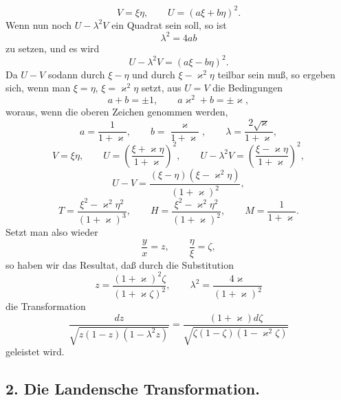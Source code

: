 \documentclass[11pt]{article}
\begin{document}
\[
V=\xi\eta,\qquad U=(a\xi+b\eta)^2.
\]
Wenn nun noch $U-\lambda^2V$ ein Quadrat sein soll, so ist
\[
\lambda^2=4ab
\]
zu setzen, und es wird
\[
U-\lambda^2V=(a\xi-b\eta)^2.
\]
Da $U-V$ sodann durch $\xi-\eta$ und durch $\xi-\varkappa^2\eta$ teilbar sein muß, so ergeben sich, wenn man $\xi=\eta$, $\xi=\varkappa^2\eta$ setzt, aus $U=V$ die Bedingungen
\[
a+b=\pm1,\qquad a\varkappa^2+b=\pm\varkappa,
\]
woraus, wenn die oberen Zeichen genommen werden,
\[
a=\frac1{1+\varkappa},\qquad
b=\frac{\varkappa}{1+\varkappa},\qquad
\lambda=\frac{2\sqrt{\varkappa}}{1+\varkappa},
\]
\[
V=\xi\eta,\qquad
U=\left(\frac{\xi+\varkappa\eta}{1+\varkappa}\right)^2,\qquad
U-\lambda^2V=\left(\frac{\xi-\varkappa\eta}{1+\varkappa}\right)^2,
\]
\[
U-V=\frac{(\xi-\eta)(\xi-\varkappa^2\eta)}{(1+\varkappa)^2},
\]
\[
T=\frac{\xi^2-\varkappa^2\eta^2}{(1+\varkappa)^3},\qquad
H=\frac{\xi^2-\varkappa^2\eta^2}{(1+\varkappa)^2},\qquad
M=\frac1{1+\varkappa}.
\]
Setzt man also wieder
\[
\frac{y}{x}=z,\qquad \frac{\eta}{\xi}=\zeta,
\]
so haben wir das Resultat, daß durch die Substitution
\begin{equation}
z=\frac{(1+\varkappa)^2\zeta}{(1+\varkappa\zeta)^2},
\qquad
\lambda^2=\frac{4\varkappa}{(1+\varkappa)^2}
\tag{2}
\end{equation}
die Transformation
\begin{equation}
\frac{dz}{\sqrt{z(1-z)(1-\lambda^2z)}}
=
\frac{(1+\varkappa)d\zeta}{\sqrt{\zeta(1-\zeta)(1-\varkappa^2\zeta)}}
\tag{3}
\end{equation}
geleistet wird.

\subsection*{2. Die Landensche Transformation.}
\end{document}
